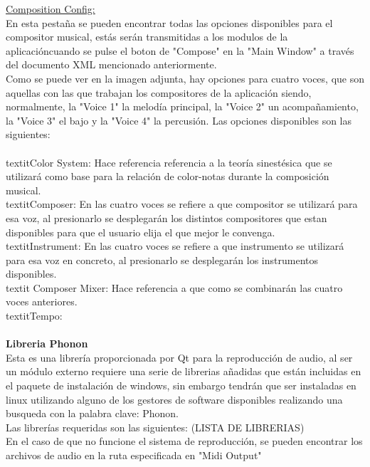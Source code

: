 \underline{Composition Config:}
\\En esta pestaña se pueden encontrar todas las opciones disponibles para el compositor musical, estás serán transmitidas a los modulos de la aplicacióncuando se pulse el boton de "Compose" en la "Main Window" a través del documento XML mencionado anteriormente.
\\Como se puede ver en la imagen adjunta, hay opciones para cuatro voces, que son aquellas con las que trabajan los compositores de la aplicación siendo, normalmente, la "Voice 1" la melodía principal, la "Voice 2" un acompañamiento, la "Voice 3" el bajo y la "Voice 4" la percusión. Las opciones disponibles son las siguientes:
\\
\newline
\\textit{Color System:} Hace referencia referencia a la teoría sinestésica que se utilizará como base para la relación de color-notas durante la composición musical.
\\textit{Composer:} En las cuatro voces se refiere a que compositor se utilizará para esa voz, al presionarlo se desplegarán los distintos compositores que estan disponibles para que el usuario elija el que mejor le convenga.
\\textit{Instrument:} En las cuatro voces se refiere a que instrumento se utilizará para esa voz en concreto, al presionarlo se desplegarán los instrumentos disponibles.
\\textit {Composer Mixer:} Hace referencia a que como se combinarán las cuatro voces anteriores.
\\textit{Tempo:} 
\\
\newline
\\{\bf Libreria Phonon}
\\Esta es una librería proporcionada por Qt para la reproducción de audio, al ser un módulo externo requiere una serie de librerias añadidas que están incluidas en el paquete de instalación de windows, sin embargo tendrán que ser instaladas en linux utilizando alguno de los gestores de software disponibles realizando una busqueda con la palabra clave: Phonon.
\\Las librerías requeridas son las siguientes: (LISTA DE LIBRERIAS)
\\En el caso de que no funcione el sistema de reproducción, se pueden encontrar los archivos de audio en la ruta especificada en "Midi Output"

